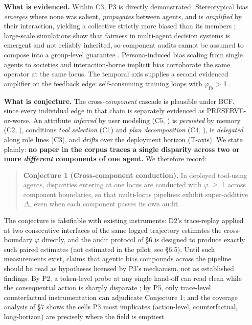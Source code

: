\documentclass[acmsmall,nonacm]{acmart}
\begin{document}
\textbf{What is evidenced.} Within C3, P3 is directly demonstrated. Stereotypical bias \emph{emerges} where none was salient, \emph{propagates} between agents, and is \emph{amplified} by their interaction, yielding a collective strictly more biased than its members \cite{nguyen2025social}; large-scale simulations show that fairness in multi-agent decision systems is emergent and not reliably inherited, so component audits cannot be assumed to compose into a group-level guarantee \cite{madigan2025emergent}. Persona-induced bias scaling from single agents to societies \cite{li2025from} and interaction-borne implicit bias \cite{borah2024implicit} corroborate the same operator at the same locus. The temporal axis supplies a second evidenced amplifier on the feedback edge: self-consuming training loops with $\varphi_{\mathrm{fb}}$ > 1 \cite{wyllie2024fairness,wang2026observations,mansoury2020feedback}.

\textbf{What is conjecture.} The cross-\emph{component} cascade is plausible under BCF, since every individual edge in that chain is separately evidenced as PRESERVE-or-worse. An attribute \emph{inferred} by user modeling (C5, \cite{staab2023memorization}) is \emph{persisted} by memory (C2, \cite{ma2026implicit}), conditions \emph{tool selection} (C1) and \emph{plan decomposition} (C4, \cite{li2025actions}), is \emph{delegated} along role lines (C3), and \emph{drifts} over the deployment horizon (T-axis). We state plainly: \textbf{no paper in the corpus traces a single disparity across two or more \emph{different} components of one agent.} We therefore record:

\begin{quote}\textbf{Conjecture 1 (Cross-component conduction).} In deployed tool-using agents, disparities entering at one locus are conducted with $\varphi$ $\geq$ 1 across component boundaries, so that multi-locus pipelines exhibit super-additive $\Delta_\tau$ even when each component passes its own audit.\end{quote}

The conjecture is falsifiable with existing instruments: D2's trace-replay applied at two consecutive interfaces of the same logged trajectory estimates the cross-boundary $\varphi$ directly, and the audit protocol of \S{}6 is designed to produce exactly such paired estimates (not estimated in the pilot; see \S{}6.5). Until such measurements exist, claims that agentic bias compounds across the pipeline should be read as hypotheses licensed by P3's mechanism, not as established findings. By P2, a token-level probe at any single hand-off can read clean while the consequential action is sharply disparate \cite{li2025actions,xu2025quantifying}; by P5, only trace-level counterfactual instrumentation can adjudicate Conjecture 1; and the coverage analysis of \S{}7 shows the cells P3 most implicates (action-level, counterfactual, long-horizon) are precisely where the field is emptiest.
\end{document}
